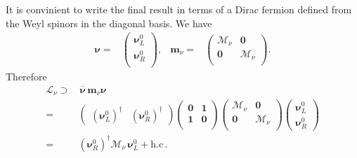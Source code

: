 It is convinient to write the final result in terms of a Dirac fermion defined from the Weyl spinors in the diagonal basis. We have
\begin{align}
  \boldsymbol{\nu}=&
  \begin{pmatrix}
    \boldsymbol{\nu}_L^0\\
    \boldsymbol{\nu}_R^0\\
  \end{pmatrix},&       \boldsymbol{m}_{\nu}=& \begin{pmatrix}
                                      \boldsymbol{\mathcal{M}}_{\nu} & \boldsymbol{0} \\
                                      \boldsymbol{0} & \boldsymbol{\mathcal{M}}_{\nu}  \\
                                    \end{pmatrix}.
\end{align}
Therefore
\begin{align}
    \mathcal{L}_{\nu}\supset &\, \overline{\boldsymbol{\nu}}\, \boldsymbol{m}_{\nu} \boldsymbol{\nu}   \nonumber\\
=&  \begin{pmatrix}
    \left( \boldsymbol{\nu}_L^0 \right)^{\dagger}&
    \left(\boldsymbol{\nu}_R^0  \right)^{\dagger}
  \end{pmatrix}
                                    \begin{pmatrix}
                                      \boldsymbol{0} & \boldsymbol{1} \\
                                      \boldsymbol{1} & \boldsymbol{0} \\
                                    \end{pmatrix}
  \begin{pmatrix}
                                      \boldsymbol{\mathcal{M}}_{\nu} & \boldsymbol{0} \\
                                      \boldsymbol{0} & \boldsymbol{\mathcal{M}}_{\nu}  \\
                                    \end{pmatrix}
\begin{pmatrix}
    \boldsymbol{\nu}_L^{0} \\
    \boldsymbol{\nu}_R^{0}
  \end{pmatrix} \nonumber\\
=&\left( \boldsymbol{\nu}_R^0 \right)^{\dagger} \boldsymbol{\mathcal{M}}_{\nu}\,   \boldsymbol{\nu}_L^{0} +\text{h.c}\,.
\end{align}
